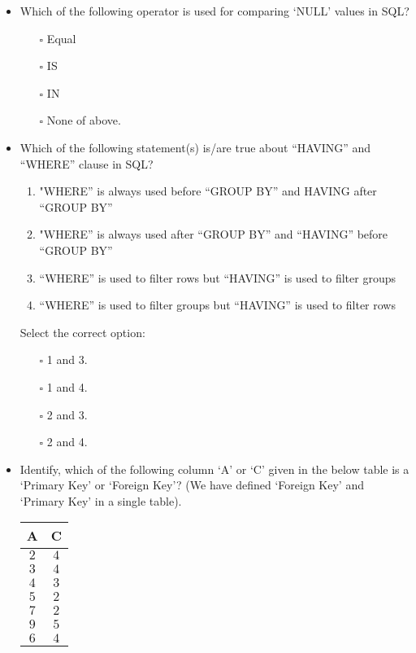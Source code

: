 \documentclass[10pt]{article}
\newcommand{\lightrule}{%
	\arrayrulecolor{black!30}%
	\midrule[\lightrulewidth]%
	\arrayrulecolor{black}}
\begin{document}
\begin{itemize}
			\item Which of the following operator is used for comparing ‘NULL’ values in SQL?
				\begin{enumerate}
					\item[$\square$] Equal
					\item[$\square$] IS
					\item[$\square$] IN
					\item[$\square$] None of above.
				\end{enumerate}

			\item Which of the following statement(s) is/are true about “HAVING” and “WHERE” clause in SQL?
				\begin{enumerate}
					\item "WHERE” is always used before “GROUP BY” and HAVING after “GROUP BY”
					\item "WHERE” is always used after “GROUP BY” and “HAVING” before “GROUP BY”
					\item “WHERE” is used to filter rows but “HAVING” is used to filter groups
					\item “WHERE” is used to filter groups but “HAVING” is used to filter rows
				\end{enumerate}
				Select the correct option:
				\begin{enumerate}
					\item[$\square$] 1 and 3.
					\item[$\square$] 1 and 4.
					\item[$\square$] 2 and 3.
					\item[$\square$] 2 and 4.
				\end{enumerate}

			\item Identify, which of the following column ‘A’ or ‘C’ given in the below table is a ‘Primary Key’ or ‘Foreign Key’? (We have defined ‘Foreign Key’ and ‘Primary Key’ in a single table).
				\begin{center}
					\centering
					\begin{tabular}{@{} *{2}{c} @{}}
						\toprule
							\textbf{A} & \textbf{C} \\
						\midrule
							$2$ & $4$  \\ 
						\lightrule
							$3$ & $4$  \\  
						\lightrule
							$4$ & $3$  \\
						\lightrule 
							$5$ & $2$  \\ 
						\lightrule 
							$7$ & $2$  \\ 
						\lightrule 
							$9$ & $5$  \\ 
						\lightrule 
							$6$ & $4$  \\
						\bottomrule
					\end{tabular}
				\end{center}


\end{itemize}
\end{document}
